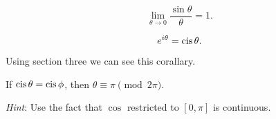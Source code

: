 \begin{theorem}
    \[ \lim_{\theta \to 0} \frac{\sin \theta}{\theta} = 1. \]
\end{theorem}

\begin{theorem}
    \[ e^{i \theta} = \operatorname{cis} \theta. \]
\end{theorem}

Using section three we can see this corallary.
\begin{cor}
    If $\operatorname{cis}{\theta} = \operatorname{cis}{\phi}$, then $\theta \equiv \pi \pmod{2\pi}$.
\end{cor}
\emph{Hint}: Use the fact that $\cos$ restricted to $[0,\pi]$ is continuous.



